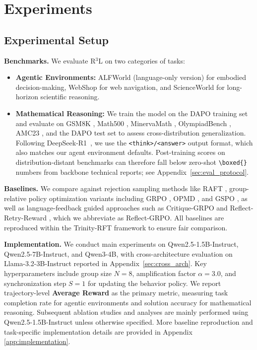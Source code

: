 \documentclass{article} %
\theoremstyle{definition}
\theoremstyle{remark}
\let\cite\citep
\begin{document}
\section{Experiments}
\subsection{Experimental Setup}
\textbf{Benchmarks.} We evaluate R$^3$L on two categories of tasks:
\begin{itemize}[leftmargin=*,nosep]
    \item \textbf{Agentic Environments:} ALFWorld (language-only version) \cite{shridhar2020alfworld} for embodied decision-making, WebShop \cite{yao2022webshop} for web navigation, and ScienceWorld \cite{wang2022scienceworld} for long-horizon scientific reasoning.
    \item \textbf{Mathematical Reasoning:} We train the model on the DAPO training set and evaluate on GSM8K \cite{cobbe2021training}, Math500 \cite{lightman2023let}, MinervaMath \cite{lewkowycz2022solving}, OlympiadBench \cite{gao2024omni}, AMC23 \cite{amc}, and the DAPO test set \cite{yu2025dapo} to assess cross-distribution generalization. Following DeepSeek-R1~\cite{guo2025deepseek}, we use the \texttt{<think>/<answer>} output format, which also matches our agent environment defaults. Post-training scores on distribution-distant benchmarks can therefore fall below zero-shot \texttt{\textbackslash boxed\{\}} numbers from backbone technical reports; see Appendix~\ref{sec:eval_protocol}.
\end{itemize}

\textbf{Baselines.} We compare against rejection sampling methods like RAFT \cite{dongraft}, group-relative policy optimization variants including GRPO \cite{shao2024deepseekmath}, OPMD \cite{yao2025group}, and GSPO \cite{zheng2025group}, as well as language-feedback guided approaches such as Critique-GRPO \cite{zhang2025critique} and Reflect-Retry-Reward \cite{bensal2025reflect}, which we abbreviate as Reflect-GRPO. All baselines are reproduced within the Trinity-RFT framework \cite{pan2025trinity} to ensure fair comparison.




\textbf{Implementation.} We conduct main experiments on Qwen2.5-1.5B-Instruct, Qwen2.5-7B-Instruct, and Qwen3-4B, with cross-architecture evaluation on Llama-3.2-3B-Instruct reported in Appendix~\ref{sec:cross_arch}. Key hyperparameters include group size $N=8$, amplification factor $\alpha=3.0$, and synchronization step $S=1$ for updating the behavior policy. We report trajectory-level \textbf{Average Reward} as the primary metric, measuring task completion rate for agentic environments and solution accuracy for mathematical reasoning. Subsequent ablation studies and analyses are mainly performed using Qwen2.5-1.5B-Instruct unless otherwise specified. More baseline reproduction and task-specific implementation details are provided in Appendix \ref{app:implementation}.
\end{document}

